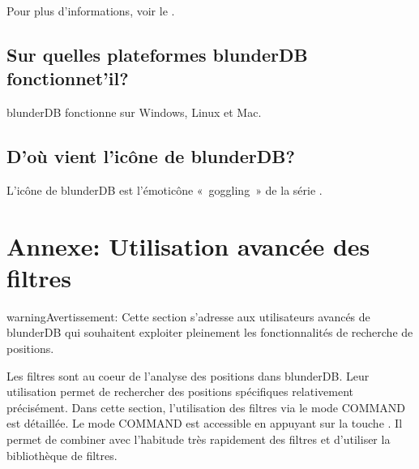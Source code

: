 \documentclass[letterpaper,10pt,french]{sphinxmanual}
\begin{document}
\sphinxAtStartPar
Pour plus d’informations, voir le .


\subsection{Sur quelles plateformes blunderDB fonctionne\sphinxhyphen{}t’il?}
\label{\detokenize{faq:sur-quelles-plateformes-blunderdb-fonctionne-t-il}}
\sphinxAtStartPar
blunderDB fonctionne sur Windows, Linux et Mac.


\subsection{D’où vient l’icône de blunderDB?}
\label{\detokenize{faq:d-ou-vient-l-icone-de-blunderdb}}
\sphinxAtStartPar
L’icône de blunderDB est l’émoticône « goggling » de la série .

\sphinxstepscope


\section{Annexe: Utilisation avancée des filtres}
\label{\detokenize{annexe_filtres:annexe-utilisation-avancee-des-filtres}}\label{\detokenize{annexe_filtres:annexe-filtres}}\label{\detokenize{annexe_filtres::doc}}
\begin{sphinxadmonition}{warning}{Avertissement:}
\sphinxAtStartPar
Cette section s’adresse aux utilisateurs avancés de blunderDB qui souhaitent
exploiter pleinement les fonctionnalités de recherche de positions.
\end{sphinxadmonition}

\sphinxAtStartPar
Les filtres sont au coeur de l’analyse des positions dans blunderDB.
Leur utilisation permet de rechercher des positions spécifiques relativement
précisément. Dans cette section, l’utilisation des filtres via le mode COMMAND
est détaillée. Le mode COMMAND est accessible en appuyant sur la touche .
Il permet de combiner avec l’habitude très rapidement des filtres et d’utiliser
la bibliothèque de filtres.
\end{document}

